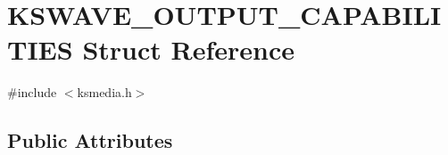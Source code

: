 \hypertarget{struct_k_s_w_a_v_e___o_u_t_p_u_t___c_a_p_a_b_i_l_i_t_i_e_s}{}\section{K\+S\+W\+A\+V\+E\+\_\+\+O\+U\+T\+P\+U\+T\+\_\+\+C\+A\+P\+A\+B\+I\+L\+I\+T\+I\+ES Struct Reference}
\label{struct_k_s_w_a_v_e___o_u_t_p_u_t___c_a_p_a_b_i_l_i_t_i_e_s}


{\ttfamily \#include $<$ksmedia.\+h$>$}

\subsection*{Public Attributes}
